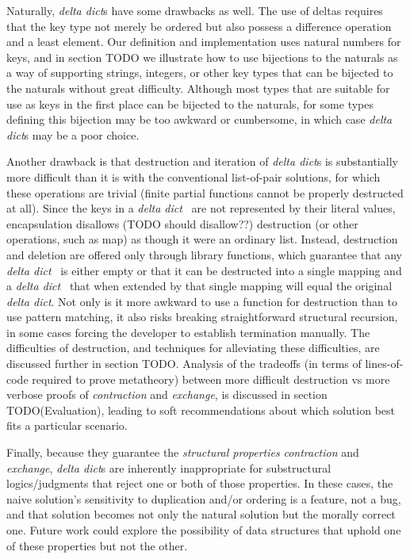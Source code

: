 \documentclass[nonacm]{acmart}
\newcommand{\dd}{\emph{delta dict}}
\theoremstyle{slplain}
\numberwithin{thm}{section}
\begin{document}
Naturally, {\dd}s have some drawbacks as well. The use of deltas requires that the key type not merely be
ordered but also possess a difference operation and a least element. Our definition and implementation uses
natural numbers for keys, and in section TODO we illustrate how to use bijections to the naturals as a way
of supporting strings, integers, or other key types that can be bijected to the naturals without great
difficulty. Although most types that are suitable for use as keys in the first place can be bijected to the
naturals, for some types defining this bijection may be too awkward or cumbersome, in which case {\dd}s may
be a poor choice.

Another drawback is that destruction and iteration of {\dd}s is substantially more
difficult than it is with the conventional list-of-pair solutions, for which these operations are trivial
(finite partial functions cannot be properly destructed at all). Since the keys in a \dd~ are not represented
by their literal values, encapsulation disallows (TODO should disallow??) destruction (or other operations,
such as map) as though it were an ordinary list. Instead, destruction and deletion are offered only through
library functions, which guarantee that any \dd~ is either empty or that it can be destructed into a single
mapping and a \dd~ that when extended by that single mapping will equal the original \dd. Not only is it
more awkward to use a function for destruction than to use pattern matching, it also risks breaking
straightforward structural recursion, in some cases forcing the developer to establish termination manually.
The difficulties of destruction, and techniques for alleviating these difficulties, are discussed further in
section TODO. Analysis of the tradeoffs (in terms of lines-of-code required to prove metatheory) between more
difficult destruction vs more verbose proofs of \emph{contraction} and \emph{exchange}, is discussed in section
TODO(Evaluation), leading to soft recommendations about which solution best fits a particular scenario.

Finally, because they guarantee the \emph{structural properties} \emph{contraction} and
\emph{exchange}, {\dd}s are inherently inappropriate for substructural logics/judgments that reject one or
both of those properties. In these cases, the naive solution's sensitivity to duplication and/or ordering is
a feature, not a bug, and that solution becomes not only the natural solution but the morally correct one.
Future work could explore the possibility of data structures that uphold one of these properties but not the
other.
\end{document}
